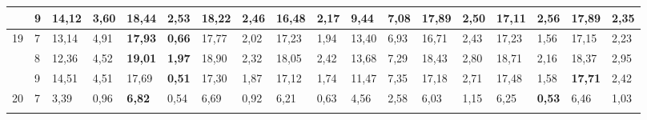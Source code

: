 \documentclass[conference]{IEEEtran}
\begin{document}
\begin{table}[]
\begin{tabular}{|cl|ll|ll|ll|ll|ll|ll|ll|ll|}
		\multicolumn{1}{|c|}{}                    & 9          & \multicolumn{1}{l|}{14,12}         & 3,60          & \multicolumn{1}{l|}{\textbf{18,44}} & 2,53          & \multicolumn{1}{l|}{18,22}          & 2,46          & \multicolumn{1}{l|}{16,48}         & \textbf{2,17} & \multicolumn{1}{l|}{9,44}                 & 7,08 & \multicolumn{1}{l|}{17,89}          & 2,50 & \multicolumn{1}{l|}{17,11}          & 2,56          & \multicolumn{1}{l|}{17,89}          & 2,35 \\ \hline
		\multicolumn{1}{|c|}{\multirow{3}{*}{19}} & 7          & \multicolumn{1}{l|}{13,14}         & 4,91          & \multicolumn{1}{l|}{\textbf{17,93}} & \textbf{0,66} & \multicolumn{1}{l|}{17,77}          & 2,02          & \multicolumn{1}{l|}{17,23}         & 1,94          & \multicolumn{1}{l|}{13,40}                & 6,93 & \multicolumn{1}{l|}{16,71}          & 2,43 & \multicolumn{1}{l|}{17,23}          & 1,56          & \multicolumn{1}{l|}{17,15}          & 2,23 \\ \cline{2-18} 
		\multicolumn{1}{|c|}{}                    & 8          & \multicolumn{1}{l|}{12,36}         & 4,52          & \multicolumn{1}{l|}{\textbf{19,01}} & \textbf{1,97} & \multicolumn{1}{l|}{18,90}          & 2,32          & \multicolumn{1}{l|}{18,05}         & 2,42          & \multicolumn{1}{l|}{13,68}                & 7,29 & \multicolumn{1}{l|}{18,43}          & 2,80 & \multicolumn{1}{l|}{18,71}          & 2,16          & \multicolumn{1}{l|}{18,37}          & 2,95 \\ \cline{2-18} 
		\multicolumn{1}{|c|}{}                    & 9          & \multicolumn{1}{l|}{14,51}         & 4,51          & \multicolumn{1}{l|}{17,69}          & \textbf{0,51} & \multicolumn{1}{l|}{17,30}          & 1,87          & \multicolumn{1}{l|}{17,12}         & 1,74          & \multicolumn{1}{l|}{11,47}                & 7,35 & \multicolumn{1}{l|}{17,18}          & 2,71 & \multicolumn{1}{l|}{17,48}          & 1,58          & \multicolumn{1}{l|}{\textbf{17,71}} & 2,42 \\ \hline
		\multicolumn{1}{|c|}{\multirow{3}{*}{20}} & 7          & \multicolumn{1}{l|}{3,39}          & 0,96          & \multicolumn{1}{l|}{\textbf{6,82}}  & 0,54          & \multicolumn{1}{l|}{6,69}           & 0,92          & \multicolumn{1}{l|}{6,21}          & 0,63          & \multicolumn{1}{l|}{4,56}                 & 2,58 & \multicolumn{1}{l|}{6,03}           & 1,15 & \multicolumn{1}{l|}{6,25}           & \textbf{0,53} & \multicolumn{1}{l|}{6,46}           & 1,03 \\ \cline{2-18} 

\end{tabular}
\end{table}
\end{document}
